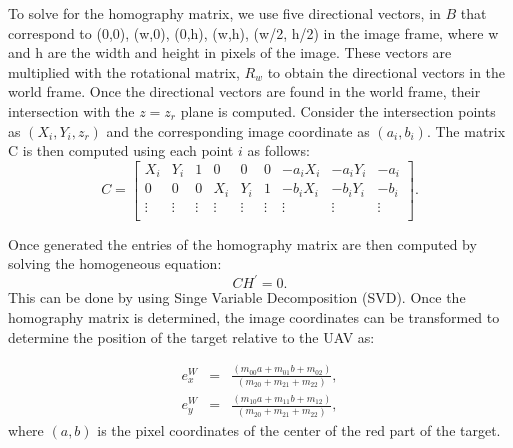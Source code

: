 \documentclass[conf]{new-aiaa}
\begin{document}
To solve for the homography matrix, we use five directional vectors, in $B$ that correspond to (0,0), (w,0), (0,h), (w,h), (w/2, h/2) in the image frame, where w and h are the width and height in pixels of the image. These vectors are multiplied with the rotational matrix, $R_{w}$ to obtain the directional vectors in the world frame. Once the directional vectors are found in the world frame, their intersection with the $z=z_{r}$ plane is computed. Consider the intersection points as $(X_{i}, Y_{i}, z_{r})$ and the corresponding image coordinate as $(a_{i},b_{i})$. The matrix C is then computed using each point $i$ as follows: 
\begin{equation}
C=
\begin{bmatrix}
X_{i} & Y_{i} & 1 & 0 & 0 & 0 & -a_{i}X_{i} & -a_{i}Y_{i} & -a_{i}\\
0 & 0 & 0 & X_{i} & Y_{i} & 1 & -b_{i}X_{i} & -b_{i}Y_{i} & -b_{i}\\
\vdots & \vdots & \vdots & \vdots & \vdots & \vdots & \vdots & \vdots & \vdots\\
\end{bmatrix}.
\end{equation}

Once generated the entries of the homography matrix are then computed by solving the homogeneous equation:
\begin{equation}
CH^{'}=0.
\end{equation}
This can be done by using Singe Variable Decomposition (SVD). Once the homography matrix is determined, the image coordinates can be transformed to determine the position of the target relative to the UAV as:

\begin{eqnarray}
    e_{x}^{W} &=& \frac{(m_{00}a + m_{01}b + m_{02})}{(m_{20} + m_{21} + m_{22})},\\
    e_{y}^{W} &=& \frac{(m_{10}a + m_{11}b + m_{12})}{(m_{20} + m_{21} + m_{22})},
\end{eqnarray}
where $(a,b)$ is the pixel coordinates of the center of the red part of the target.
\end{document}
